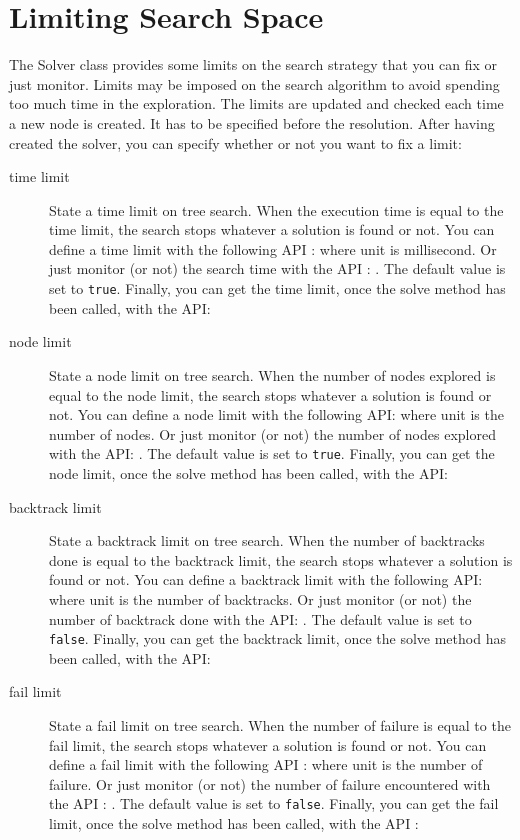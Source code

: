 \section{Limiting Search Space}\label{solver:limitingsearchspace}\hypertarget{solver:limitingsearchspace}{}
The Solver class provides some limits on the search strategy that you can fix or just monitor.
Limits may be imposed on the search algorithm to avoid spending too much time in the exploration. The limits are updated and checked each time a new node is created. It has to be specified before the resolution. 
After having created the solver, you can specify whether or not you want to fix a limit:

\begin{description}
\item[time limit] State a time limit on tree search. When the execution time is equal to the time limit, the search stops whatever a solution is found or not. You can define a time limit with the following API :  where unit is millisecond. Or just monitor (or not) the search time with the API : . The default value is set to \texttt{true}. Finally, you can get the time limit, once the solve method has been called, with the API:  
\item[node limit] State a node limit on tree search. When the number of nodes explored is equal to the node limit, the search stops whatever a solution is found or not. You can define a node limit with the following API:  where unit is the number of nodes. Or just monitor (or not) the number of nodes explored with the API: . The default value is set to \texttt{true}. Finally, you can get the node limit, once the solve method has been called, with the API:  
\item[backtrack limit] State a backtrack limit on tree search. When the number of backtracks done is equal to the backtrack limit, the search stops whatever a solution is found or not. You can define a backtrack limit with the following API:  where unit is the number of backtracks. Or just monitor (or not) the number of backtrack done with the API: . The default value is set to \texttt{false}. Finally, you can get the backtrack limit, once the solve method has been called, with the API:  
\item[fail limit] State a fail limit on tree search. When the number of failure is equal to the fail limit, the search stops whatever a solution is found or not. You can define a fail limit with the following API :  where unit is the number of failure. Or just monitor (or not) the number of failure encountered with the API : . The default value is set to \texttt{false}. Finally, you can get the fail limit, once the solve method has been called, with the API :  

\end{description}
